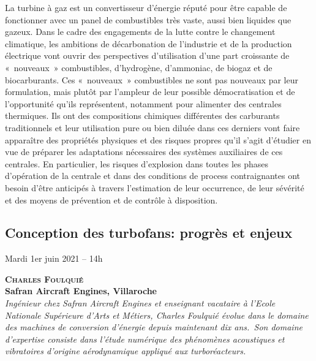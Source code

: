 La turbine à gaz est un convertisseur d’énergie réputé pour être capable de fonctionner avec un panel de combustibles très vaste, aussi bien liquides que gazeux. Dans le cadre des engagements de la lutte contre le changement climatique, les ambitions de décarbonation de l’industrie et de la production électrique vont ouvrir des perspectives d’utilisation d’une part croissante de « nouveaux » combustibles, d’hydrogène, d’ammoniac, de biogaz et de biocarburants. Ces « nouveaux » combustibles ne sont pas nouveaux par leur formulation, mais plutôt par l’ampleur de leur possible démocratisation et de l’opportunité qu’ils représentent, notamment pour alimenter des centrales thermiques. Ils ont des compositions chimiques différentes des carburants traditionnels et leur utilisation pure ou bien diluée dans ces derniers vont faire apparaître des propriétés physiques et des risques propres qu’il s’agit d’étudier en vue de préparer les adaptations nécessaires des systèmes auxiliaires de ces centrales. En particulier, les risques d’explosion dans toutes les phases d’opération de la centrale et dans des conditions de process contraignantes ont besoin d’être anticipés à travers l’estimation de leur occurrence, de leur sévérité et des moyens de prévention et de contrôle à disposition.


%
\clearpage
{}\subsection*{Conception des turbofans:  progrès et enjeux}
%
\begin{center}
Mardi 1er juin 2021 -- 14h
\end{center}

\hspace{0.04\linewidth}\vrule\hspace{0.01\linewidth}\parbox{0.88\linewidth}{
\textbf{{\scshape Charles Foulquié}\\Safran Aircraft Engines, Villaroche}\\
{\slshape Ingénieur chez Safran Aircraft Engines et enseignant vacataire à l'Ecole Nationale Supérieure d'Arts et Métiers, Charles Foulquié évolue dans le domaine des machines de conversion d'énergie depuis maintenant dix ans. Son domaine d’expertise consiste dans l'étude numérique des phénomènes acoustiques et vibratoires d’origine aérodynamique appliqué aux turboréacteurs.}}\\[2ex]

